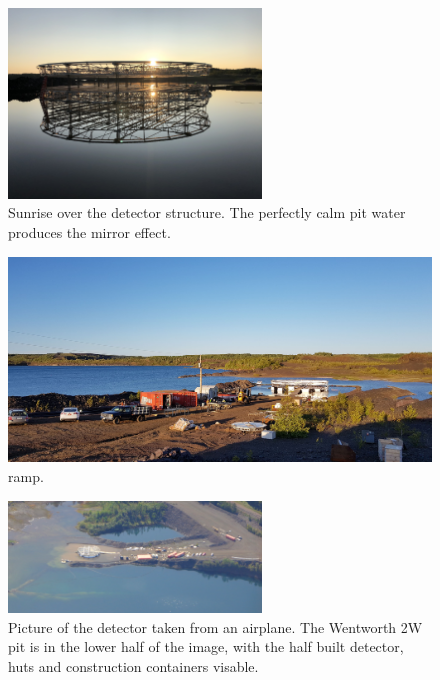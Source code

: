 \begin{figure} %
    \includegraphics[width=0.6\textwidth]{diagrams/4-chips/sunrise.jpeg}
    \caption[Sunrise over the \chips detector.]
    {Sunrise over the \chips detector structure. The perfectly calm pit water
        produces the mirror effect.}
    \label{fig:sunrise}
\end{figure}

\begin{figure} %
    \includegraphics[width=\textwidth]{diagrams/4-chips/ramp.jpg}
    \caption[ramp.]
    {ramp.}
    \label{fig:ramp}
\end{figure}

\begin{figure} %
    \includegraphics[width=0.6\textwidth]{diagrams/4-chips/from_the_sky.jpg}
    \caption[Picture of the \chips detector from the air.]
    {Picture of the \chips detector taken from an airplane. The Wentworth 2W pit is in the lower
        half of the image, with the half built detector, huts and construction containers
        visable.}
    \label{fig:from_the_sky}
\end{figure}

